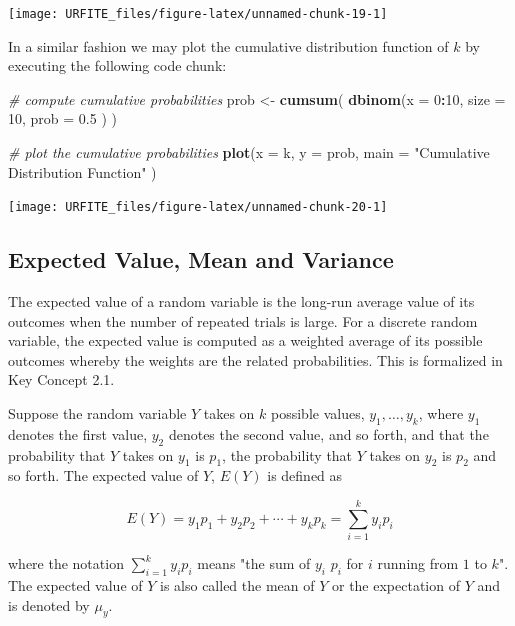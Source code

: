 \documentclass[]{book}
\newenvironment{Shaded}{\begin{snugshade}}{\end{snugshade}}
\newcommand{\KeywordTok}[1]{\textcolor[rgb]{0.13,0.29,0.53}{\textbf{#1}}}
\newcommand{\DataTypeTok}[1]{\textcolor[rgb]{0.13,0.29,0.53}{#1}}
\newcommand{\DecValTok}[1]{\textcolor[rgb]{0.00,0.00,0.81}{#1}}
\newcommand{\FloatTok}[1]{\textcolor[rgb]{0.00,0.00,0.81}{#1}}
\newcommand{\StringTok}[1]{\textcolor[rgb]{0.31,0.60,0.02}{#1}}
\newcommand{\CommentTok}[1]{\textcolor[rgb]{0.56,0.35,0.01}{\textit{#1}}}
\newcommand{\OperatorTok}[1]{\textcolor[rgb]{0.81,0.36,0.00}{\textbf{#1}}}
\newcommand{\NormalTok}[1]{#1}
\theoremstyle{definition}
\theoremstyle{definition}
\theoremstyle{definition}
\theoremstyle{remark}
\begin{document}
\begin{center}\texttt{[image: URFITE\_files/figure-latex/unnamed-chunk-19-1]} \end{center}

In a similar fashion we may plot the cumulative distribution function of
\(k\) by executing the following code chunk:

\begin{Shaded}
\begin{Highlighting}[]
\CommentTok{# compute cumulative probabilities}
\NormalTok{prob <-}\StringTok{ }\KeywordTok{cumsum}\NormalTok{(}
              \KeywordTok{dbinom}\NormalTok{(}\DataTypeTok{x =} \DecValTok{0}\OperatorTok{:}\DecValTok{10}\NormalTok{, }
                     \DataTypeTok{size =} \DecValTok{10}\NormalTok{, }
                     \DataTypeTok{prob =} \FloatTok{0.5}
\NormalTok{                     )}
\NormalTok{              )}

\CommentTok{# plot the cumulative probabilities}
\KeywordTok{plot}\NormalTok{(}\DataTypeTok{x =}\NormalTok{ k, }
     \DataTypeTok{y =}\NormalTok{ prob,}
     \DataTypeTok{main =} \StringTok{"Cumulative Distribution Function"}
\NormalTok{     ) }
\end{Highlighting}
\end{Shaded}

\begin{center}\texttt{[image: URFITE\_files/figure-latex/unnamed-chunk-20-1]} \end{center}

\subsection*{Expected Value, Mean and
Variance}\label{expected-value-mean-and-variance}

The expected value of a random variable is the long-run average value of
its outcomes when the number of repeated trials is large. For a discrete
random variable, the expected value is computed as a weighted average of
its possible outcomes whereby the weights are the related probabilities.
This is formalized in Key Concept 2.1.

\begin{keyconcepts}{2.1}
Suppose the random variable $Y$
takes on $k$ possible values, $y_1, \dots, y_k$, where $y_1$ denotes the first
value, $y_2$ denotes the second value, and so forth, and that the probability
that $Y$ takes on $y_1$ is $p_1$, the probability that $Y$ takes on $y_2$ is
$p_2$ and so forth. The expected value of $Y$, $E(Y)$ is defined as

$$ E(Y) = y_1 p_1 + y_2 p_2 + \cdots + y_k p_k = \sum_{i=1}^k y_i p_i $$

where the notation $\sum_{i=1}^k y_i p_i$ means "the sum of $y_i$ $p_i$ for $i$
running from $1$ to $k$". The expected value of $Y$ is also called the mean of $Y$
or the expectation of $Y$ and is denoted by $\mu_y$.
\end{keyconcepts}
\end{document}
